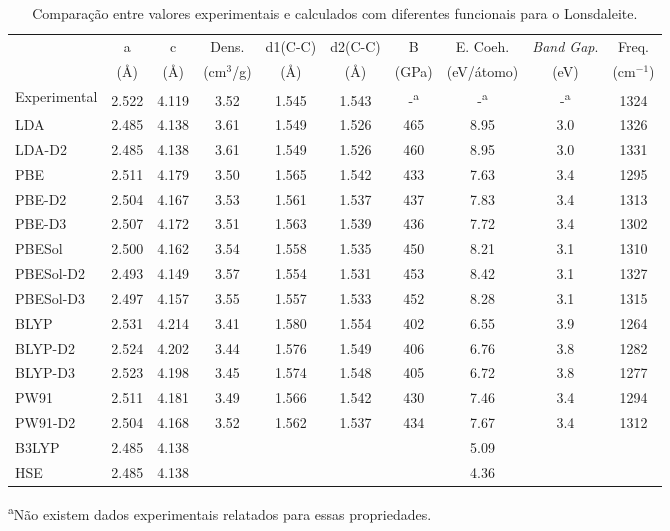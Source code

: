  		\begin{table}[!h]
 			\centering
 			\caption{Comparação entre valores experimentais e calculados com diferentes funcionais para o Lonsdaleite.}
 			\label{lonsdaleite}
 			\renewcommand{\arraystretch}{1.1}
 			\tiny\selectfont
 			\begin{tabular}{l|ccccccccc}
 				\hline\hline
 				& a     & c     & Dens. & d1(C-C) & d2(C-C) & B & E. Coeh. & \textit{Band Gap}. & Freq. \\
 				& (Å) & (Å) & (cm$^3$/g) & (Å) & (Å) & (GPa) & (eV/átomo) & (eV) & (cm$^{-1}$)\\ \hline
 				Experimental  & 2.522 \textsuperscript{\cite{bundy1967hexagonal}} & 4.119\textsuperscript{\cite{bundy1967hexagonal}} & 3.52\textsuperscript{\cite{bundy1967hexagonal}} & 1.545\textsuperscript{\cite{bundy1967hexagonal}} & 1.543\textsuperscript{\cite{bundy1967hexagonal}} &  -\textsuperscript{a}  & -\textsuperscript{a}     &  -\textsuperscript{a}  & 1324\textsuperscript{\cite{misra2006hexagonal}} \\
 				LDA           & 2.485 & 4.138 & 3.61 & 1.549 & 1.526 & 465 &  8.95  & 3.0 & 1326 \\
 				LDA-D2        & 2.485 & 4.138 & 3.61 & 1.549 & 1.526 & 460 &  8.95  & 3.0 & 1331 \\
 				PBE       & 2.511 & 4.179 & 3.50 & 1.565 & 1.542 & 433 &  7.63  & 3.4 & 1295 \\
 				PBE-D2    & 2.504 & 4.167 & 3.53 & 1.561 & 1.537 & 437 &  7.83  & 3.4 & 1313 \\
 				PBE-D3    & 2.507 & 4.172 & 3.51 & 1.563 & 1.539 & 436 &  7.72  & 3.4 & 1302 \\
 				PBESol    & 2.500 & 4.162 & 3.54 & 1.558 & 1.535 & 450 &  8.21  & 3.1 & 1310 \\
 				PBESol-D2 & 2.493 & 4.149 & 3.57 & 1.554 & 1.531 & 453 &  8.42  & 3.1 & 1327 \\
 				PBESol-D3 & 2.497 & 4.157 & 3.55 & 1.557 & 1.533 & 452 &  8.28  & 3.1 & 1315 \\
 				BLYP      & 2.531 & 4.214 & 3.41 & 1.580 & 1.554 & 402 &  6.55  & 3.9 & 1264 \\
 				BLYP-D2   & 2.524 & 4.202 & 3.44 & 1.576 & 1.549 & 406 &  6.76  & 3.8 & 1282 \\
 				BLYP-D3   & 2.523 & 4.198 & 3.45 & 1.574 & 1.548 & 405 &  6.72  & 3.8 & 1277 \\
 				PW91      & 2.511 & 4.181 & 3.49 & 1.566 & 1.542 & 430 &  7.46  & 3.4 & 1294 \\
 				PW91-D2   & 2.504 & 4.168 & 3.52 & 1.562 & 1.537 & 434 &  7.67  & 3.4 & 1312 \\
 				B3LYP         & 2.485 & 4.138 &      &       &       &     &  5.09  &     &      \\
 				HSE           & 2.485 & 4.138 &      &       &       &     &  4.36  &     &      \\ \hline\hline           
 			\end{tabular}
 		\begin{flushleft}
 			\textsuperscript{a}Não existem dados experimentais relatados para essas propriedades.
 		\end{flushleft}
 		\end{table}
 	
